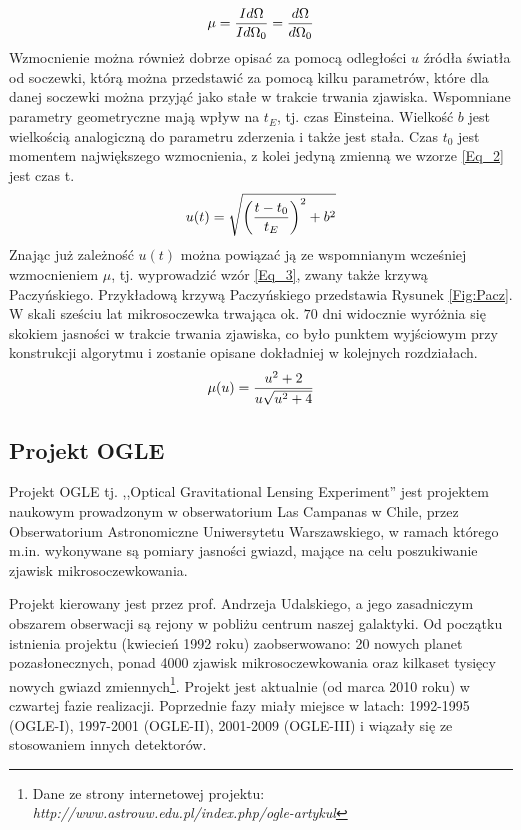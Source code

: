 \documentclass[a4paper,11pt]{article}
\newcommand{\ak}{\hspace{0.7 cm}}
\begin{document}
\begin{equation}
\centering
\mu=\frac{Id\Omega}{Id\Omega_{0}}=\frac{d\Omega}{d\Omega_{0}}
\label{Eq_1}
\end{equation}
\flushleft
\ak Wzmocnienie można również dobrze opisać za pomocą odległości $u$ źródła światła od soczewki, którą można przedstawić za pomocą kilku parametrów, które dla danej soczewki można przyjąć jako stałe w trakcie trwania zjawiska. Wspomniane parametry geometryczne mają wpływ na $t_{E}$, tj. czas Einsteina. Wielkość $b$ jest wielkością analogiczną do parametru zderzenia i także jest stała. Czas $t_{0}$ jest momentem największego wzmocnienia, z kolei jedyną zmienną we wzorze \ref{Eq_2} jest czas {t}.
\begin{equation}
\centering
u(t)=\sqrt{\left(\frac{t-t_{0}}{t_{E}}\right)^{2}+b^{2}}
\label{Eq_2}
\end{equation}
\ak Znając już zależność $u(t)$ można powiązać ją ze wspomnianym wcześniej wzmocnieniem $\mu$, tj. wyprowadzić wzór \ref{Eq_3}, zwany także krzywą Paczyńskiego. Przykładową krzywą Paczyńskiego przedstawia Rysunek \ref{Fig:Pacz}.
W skali sześciu lat mikrosoczewka trwająca ok. $70$ dni widocznie wyróżnia się skokiem jasności w trakcie trwania zjawiska, co było punktem wyjściowym przy konstrukcji algorytmu i zostanie opisane dokładniej w kolejnych rozdziałach.
\begin{equation}
\centering
\mu(u)=\frac{u^{2}+2}{u\sqrt{u^{2}+4}}
\label{Eq_3}
\end{equation}
\flushleft
\subsection{Projekt OGLE}

\ak Projekt OGLE  tj. ,,Optical Gravitational Lensing Experiment'' jest projektem naukowym prowadzonym w obserwatorium Las Campanas w Chile, przez Obserwatorium Astronomiczne Uniwersytetu Warszawskiego, w ramach którego m.in. wykonywane są pomiary jasności gwiazd, mające na celu poszukiwanie zjawisk mikrosoczewkowania. 

\ak Projekt kierowany jest przez prof. Andrzeja Udalskiego, a jego zasadniczym obszarem obserwacji są rejony w pobliżu centrum naszej galaktyki. Od początku istnienia projektu (kwiecień 1992 roku) zaobserwowano: 20 nowych planet pozasłonecznych, ponad 4000 zjawisk mikrosoczewkowania oraz kilkaset tysięcy nowych gwiazd zmiennych\footnote{Dane ze strony internetowej projektu: \textit{http://www.astrouw.edu.pl/index.php/ogle-artykul}}. Projekt jest aktualnie (od marca 2010 roku) w czwartej fazie realizacji. Poprzednie fazy miały miejsce w latach: 1992-1995 (OGLE-I), 1997-2001 (OGLE-II), 2001-2009 (OGLE-III) i wiązały się ze stosowaniem innych detektorów.
 
\end{document}
